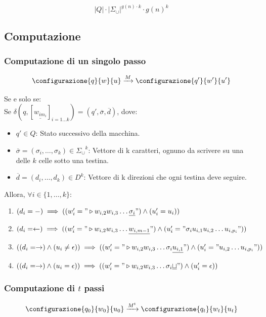{\[|Q| \cdot |{\Sigma_\cup|}^{g(n) \cdot k} \cdot g(n)^k\]}


\subsection{Computazione}
\subsubsection{Computazione di un singolo passo}
\[
\configurazione{q}{w}{u}
\xrightarrow{M}
\configurazione{q'}{w'}{u'}
\]

Se e solo se: \\

Se $\delta(q, [\underline{w_{i{m_i}}}]_{i=1 \dots k}) = (q', \overline{\sigma}, \overline{d})$, dove:
\begin{itemize}
    \item $q' \in Q$: Stato successivo della macchina.
    \item $\overline{\sigma} = (\sigma_i, \dots, \sigma_k) \in {\Sigma_\cup}^k$: Vettore di k caratteri, ognuno da scrivere su una delle $k$ celle sotto una testina.
    \item $\overline{d} = (d_i, \dots, d_k) \in D^k$: Vettore di k direzioni che ogni testina deve seguire.
\end{itemize}

Allora, $\forall i \in \{1, \dots, k\} :$
{\small
\begin{enumerate}
    \item $(d_i = -) \implies ((w'_i = "\triangleright w_{i,2} w_{i,3} \dots \underline{\sigma_i}") \land (u'_i = u_i))$
    \item $(d_i = \leftarrow) \implies ((w'_i = "\triangleright w_{i,2} w_{i,3} \dots \underline{w_{i,m-1}}") \land (u'_i = "\sigma_i u_{i,1} u_{i,2} \dots u_{i,p_i}"))$
    \item $((d_i = \rightarrow) \land (u_i \neq \epsilon)) \implies ((w'_i = "\triangleright w_{i,2} w_{i,3} \dots \sigma_i \underline{u_{i,1}}") \land (u'_i = "u_{i,2} \dots u_{i,p_i}")) $
    \item $((d_i = \rightarrow) \land (u_i = \epsilon)) \implies ((w'_i = "\triangleright w_{i,2} w_{i,3} \dots \sigma_i \underline{\sqcup}") \land (u'_i = \epsilon)) $
\end{enumerate}
}

\subsubsection{Computazione di $t$ passi}
\[
\configurazione{q_0}{w_0}{u_0}
\xrightarrow{M^t}
\configurazione{q_t}{w_t}{u_t}
\] \\

